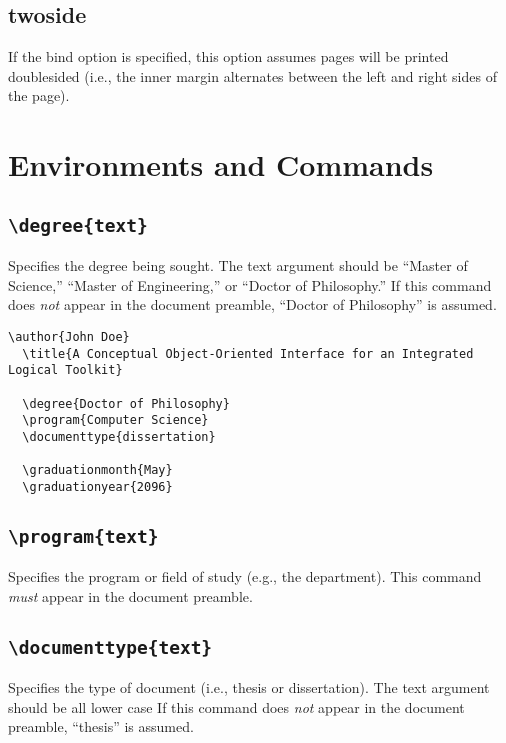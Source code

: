 \documentclass[10pt]{article}
\newcommand{\option}[1]{#1}
\newcommand{\command}[1]{\texttt{\textbackslash#1}}
\begin{document}
\subsection{\option{twoside}}
If the bind option is specified, this option assumes pages will be printed doublesided (i.e., the inner margin alternates between the left and right sides of the page).

\section{Environments and Commands}

\subsection{\command{degree\{text\}}}
Specifies the degree being sought.
The text argument should be ``Master of Science,'' ``Master of Engineering,'' or ``Doctor of Philosophy.''
If this command does \emph{not} appear in the document preamble, ``Doctor of Philosophy'' is assumed.

\begin{lstlisting}[gobble=2,float=h,caption={Sample document preamble showing the \command{degree}, \command{program}, \command{documenttype}, \command{graduationmonth}, and \command{graduationyear} commands.}]
  \author{John Doe}
  \title{A Conceptual Object-Oriented Interface for an Integrated Logical Toolkit}
  
  \degree{Doctor of Philosophy}
  \program{Computer Science}
  \documenttype{dissertation}
  
  \graduationmonth{May}
  \graduationyear{2096}
\end{lstlisting}

\subsection{\command{program\{text\}}}
Specifies the program or field of study (e.g., the department).
This command \emph{must} appear in the document preamble.

\subsection{\command{documenttype\{text\}}}
Specifies the type of document (i.e., thesis or dissertation).
The text argument should be all lower case
If this command does \emph{not} appear in the document preamble, ``thesis'' is assumed.
\end{document}
